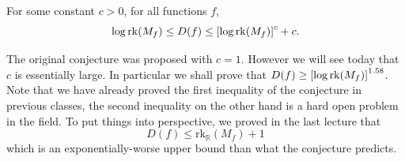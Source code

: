 \documentclass[letterpaper]{article}
\newcommand{\reals}{\mathbb{R}}
\providecommand\sqbrac[1]{\ensuremath \left[#1\right]}
\newcommand{\rk}{\mathrm{rk}}
\newcommand{\mf}{M_f}
\newcommand{\df}{D(f)}
\begin{document}
\begin{conjecture}
\label{conj:log_rank}
For some constant $c > 0$, for all functions $f$,
$$
\log \rk (\mf) \leq \df \leq \sqbrac{\log \rk (\mf)}^c + c.
$$
\end{conjecture}
\begin{remark}
The original conjecture was proposed with $c=1$. However we will see today that $c$ is essentially large. In particular we shall prove that $\df \geq \sqbrac{\log \rk (\mf)}^{1.58}$.
Note that we have already proved the first inequality of the conjecture in previous classes, the second inequality on the other hand is a hard open problem in the field. To put things into perspective, we proved in the last lecture that
$$
\df \leq \rk_\reals (\mf) + 1
$$
which is an exponentially-worse upper bound than what the conjecture predicts.
\end{remark}
\end{document}
